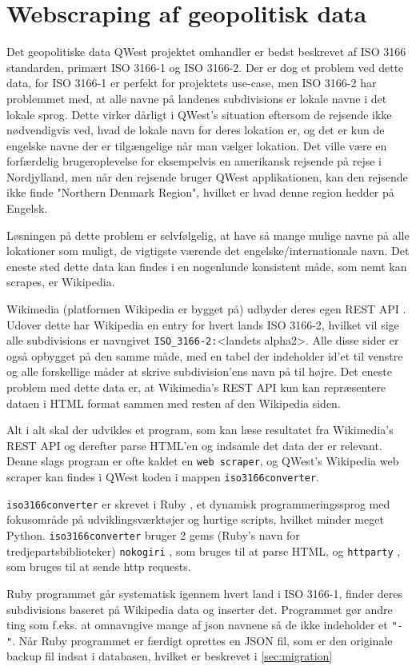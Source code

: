 \section{Webscraping af geopolitisk data}\label{sec:datascraping}
Det geopolitiske data QWest projektet omhandler er bedst beskrevet af ISO 3166 standarden\cite{ISO3166}, primært ISO 3166-1 og ISO 3166-2. Der er dog et problem ved dette data, for ISO 3166-1 er perfekt for projektets use-case, men ISO 3166-2 har problemmet med, at alle navne på landenes subdivisions er lokale navne i det lokale sprog. Dette virker dårligt i QWest's situation eftersom de rejsende ikke nødvendigvis ved, hvad de lokale navn for deres lokation er, og det er kun de engelske navne der er tilgængelige når man vælger lokation. Det ville være en forfærdelig brugeroplevelse for eksempelvis en amerikansk rejsende på rejse i Nordjylland, men når den rejsende bruger QWest applikationen, kan den rejsende ikke finde "Northern Denmark Region", hvilket er hvad denne region hedder på Engelsk.

Løsningen på dette problem er selvfølgelig, at have så mange mulige navne på alle lokationer som muligt, de vigtigste værende det engelske/internationale navn. Det eneste sted dette data kan findes i en nogenlunde konsistent måde, som nemt kan scrapes, er Wikipedia.

Wikimedia (platformen Wikipedia er bygget på) udbyder deres egen REST API \cite{Wikimedia-REST-API-Documentation}. Udover dette har Wikipedia en entry for hvert lands ISO 3166-2, hvilket vil sige alle subdivisions er navngivet \texttt{ISO\_3166-2:}<landets alpha2>. Alle disse sider er også opbygget på den samme måde, med en tabel der indeholder id'et til venstre og alle forskellige måder at skrive subdivision'ens navn på til højre. Det eneste problem med dette data er, at Wikimedia's REST API kun kan repræsentere dataen i HTML format sammen med resten af den Wikipedia siden.

Alt i alt skal der udvikles et program, som kan læse resultatet fra Wikimedia's REST API og derefter parse HTML'en og indsamle det data der er relevant. 
Denne slags program er ofte kaldet en \texttt{web scraper}, og QWest's Wikipedia web scraper kan findes i QWest koden i mappen \texttt{iso3166converter}.

\texttt{iso3166converter} er skrevet i Ruby \cite{RubyLang}, et dynamisk programmeringssprog med fokusområde på udviklingsværktøjer og hurtige scripts, hvilket minder meget Python\cite{python}. \texttt{iso3166converter} bruger 2 gems (Ruby's navn for tredjepartsbiblioteker) \texttt{nokogiri} \cite{nokogiri}, som bruges til at parse HTML, og \texttt{httparty} \cite{httparty}, som bruges til at sende http requests.

Ruby programmet går systematisk igennem hvert land i ISO 3166-1, finder deres subdivisions baseret på Wikipedia data og inserter det. Programmet gør andre ting som f.eks. at omnavngive mange af json navnene så de ikke indeholder et \texttt{"-"}. Når Ruby programmet er færdigt oprettes en JSON fil, som er den originale backup fil indsat i databasen, hvilket er beskrevet i \ref{sec:migration}